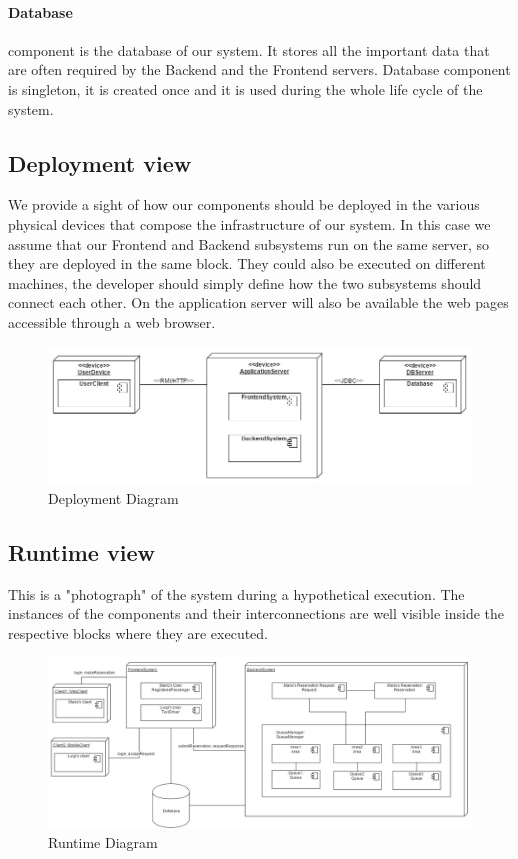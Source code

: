 		\paragraph{Database} component is the database of our system. It stores all the important data that are often required by the Backend and the Frontend servers. Database component is singleton, it is created once and it is used during the whole life cycle of the system.
	\begin{landscape}
	\subsection{Deployment view}
	We provide a sight of how our components should be deployed in the various physical devices that compose the
	infrastructure of our system. In this case we assume that our Frontend and Backend subsystems run on the same
	server, so they are deployed in the same block. They could also be executed on different machines, the developer
	should simply define how the two subsystems should connect each other. On the application server will also
	be available the web pages accessible through a web browser.
		\begin{figure}[h!]
			\begin{center}
				\includegraphics[width=0.9\linewidth]{../SE2_IMAGES/DeploymentDiagram}
				\caption{Deployment Diagram}
			\end{center}
		\end{figure}
	\end{landscape}
	\newpage
	\begin{landscape}
	\subsection{Runtime view}
	This is a "photograph" of the system during a hypothetical execution. The instances of the components and
	their interconnections are well visible inside the respective blocks where they are executed.
		\begin{figure}[h!]
			\begin{center}
				\includegraphics[width=0.9\linewidth]{../SE2_IMAGES/RuntimeDiagram}
				\caption{Runtime Diagram}
			\end{center}
		\end{figure}
	\end{landscape}
